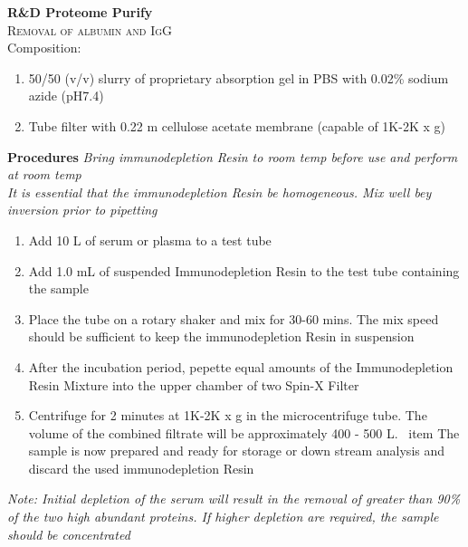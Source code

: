 \textbf{R&D Proteome Purify} 
\\
\textsc{Removal of albumin and IgG}
\\
Composition: 
\begin{enumerate}
    \item{50/50 (v/v) slurry of proprietary absorption gel in PBS with 0.02\% sodium azide (pH7.4)}
    \item{Tube filter with 0.22 \mu m cellulose acetate membrane (capable of 1K-2K x g)}
\end{enumerate}

\textbf{Procedures}
\textit{Bring immunodepletion Resin to room temp before use and perform at room temp} \\
\textit{It is essential that the immunodepletion Resin be homogeneous. Mix well bey inversion prior to pipetting}
\begin{enumerate}
    \item {Add 10 \mu L of serum or plasma to a test tube}
    \item {Add 1.0 mL of suspended Immunodepletion Resin to the test tube containing the sample}
    \item {Place the tube on a rotary shaker and mix for 30-60 mins. The mix speed should be sufficient to keep the immunodepletion Resin in suspension}
    \item {After the incubation period, pepette equal amounts of the Immunodepletion Resin Mixture into the upper chamber of two Spin-X Filter}
    \item {Centrifuge for 2 minutes at 1K-2K x g in the microcentrifuge tube. The volume of the combined filtrate will be approximately 400 - 500 \mu L.}
    \ item {The sample is now prepared and ready for storage or down stream analysis and discard the used immunodepletion Resin}
\end{enumerate}
\footnotesize
\textit{Note: Initial depletion of the serum will result in the removal of greater than 90\% of the two high abundant proteins. If higher depletion are required, the sample should be concentrated }
